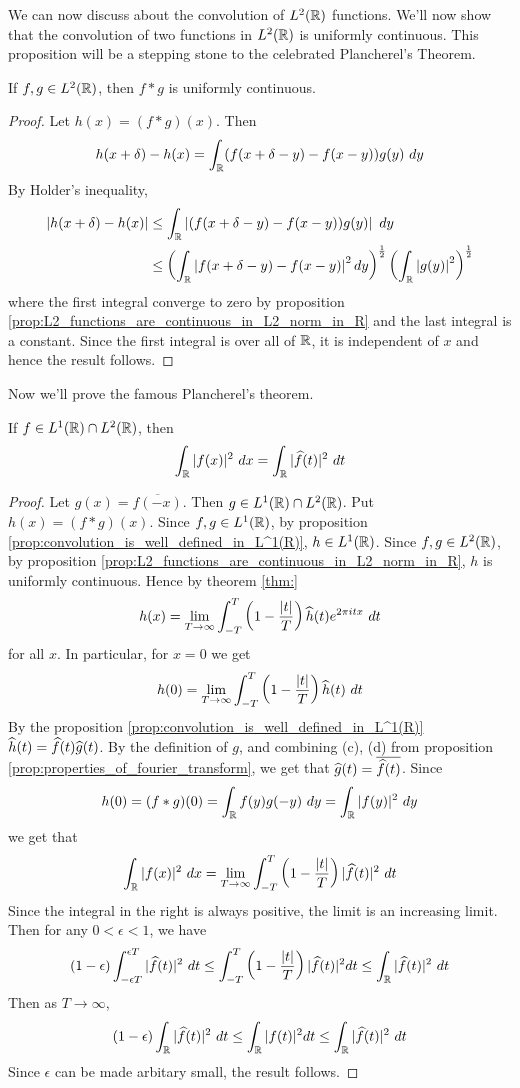 We can now discuss about the convolution of $L^2(\mathbb R)$ functions. We'll now show that the convolution of two functions in $L^2(\mathbb R)$ is uniformly continuous. This proposition will be a stepping stone to the celebrated Plancherel's Theorem.

  \begin{proposition}
    If $f, g \in L^2(\mathbb R)$, then $f*g$ is uniformly continuous.
  \end{proposition}
  \begin{proof}
    Let $h(x) = (f*g)(x)$. Then $$h(x+\delta) - h(x) = \int_\mathbb R (f(x+\delta - y) - f(x-y)) g(y) \ dy$$
    By Holder's inequality, 
    \begin{align*}
      |h(x+\delta) - h(x)| &\le \int_\mathbb R \left|(f(x+\delta - y) - f(x-y)) g(y) \right| \ dy \\
      &\le \left( \int_\mathbb R \left|f(x+\delta - y) - f(x-y) \right|^2 dy\right)^{\frac{1}{2}} \left( \int_\mathbb R \left|g(y)\right|^2 \right)^{\frac{1}{2}}
    \end{align*}
    where the first integral converge to zero by proposition \ref{prop:L2_functions_are_continuous_in_L2_norm_in_R} and the last integral is a constant. Since the first integral is over all of $\mathbb R$, it is independent of $x$ and hence the result follows.
  \end{proof}

Now we'll prove the famous Plancherel's theorem.
\begin{theorem}
  \label{thm:Plancherel's_theorem}
  If $f \in L^1(\mathbb R) \cap L^2(\mathbb R)$, then $$\int_\R |f(x)|^2 \ dx = \int_\R |\hatf(t)|^2 \ dt $$
\end{theorem}
\begin{proof}
  Let $g(x) = \overline{f(-x)}$. Then $g \in L^1(\mathbb R)\cap L^2(\mathbb R)$. Put $h(x) = (f*g)(x)$. Since $f, g \in L^1(\mathbb R)$, by proposition \ref{prop:convolution_is_well_defined_in_L^1(R)}, $h \in L^1(\mathbb R)$. Since $f, g \in L^2(\mathbb R)$, by proposition \ref{prop:L2_functions_are_continuous_in_L2_norm_in_R}, $h$ is uniformly continuous. 
  Hence by theorem \ref{thm:}  $$h(x) = \lim_{T\to \infty} \int_{-T}^T \left(1-\frac{|t|}{T}\right) \widehat{h}(t)e^{2\pi itx} \ dt $$ for all $x$. In particular, for $x=0$ we get $$h(0) = \lim_{T\to \infty} \int_{-T}^T \left(1-\frac{|t|}{T}\right) \widehat{h}(t) \ dt$$
  By the proposition \ref{prop:convolution_is_well_defined_in_L^1(R)} $\widehat{h}(t) = \widehat{f}(t)\widehat{g}(t)$. By the definition of $g$, and combining (c), (d) from proposition \ref{prop:properties_of_fourier_transform}, we get that $\widehat{g}(t) = \overline{\widehat{f}(t)}$.
  Since $$h(0) = (f*g)(0) = \int_\mathbb R f(y)g(-y) \ dy = \int_\mathbb R |f(y)|^2 \ dy$$
  we get that $$\int_\R |f(x)|^2 \ dx = \lim_{T\to \infty} \int_{-T}^T \left(1-\frac{|t|}{T}\right) |\hatf(t)|^2 \ dt$$
  Since the integral in the right is always positive, the limit is an increasing limit. Then for any $0<\epsilon<1$, we have $$(1-\epsilon) \int_{-\epsilon T}^{\epsilon T} |\hatf(t)|^2 \ dt \le \int_{-T}^{T} \left( 1-\frac{|t|}{T} \right) |\hatf(t)|^2 dt \le \int_\R |\hatf(t)|^2 \ dt$$
  Then as $T \to \infty$, $$(1-\epsilon) \int_\mathbb R |\widehat{f}(t)|^2 \ dt \le \int_{\mathbb R} |f(t)|^2 dt \le \int_\mathbb R |\widehat{f}(t)|^2 \ dt$$
  Since $\epsilon$ can be made arbitary small, the result follows.


\end{proof}
